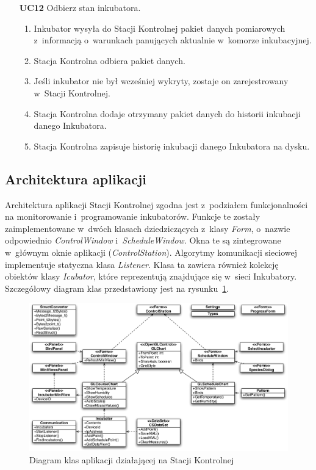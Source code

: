 \begin{itemize}
	\item[\textbf{UC12}] Odbierz stan inkubatora.
		\begin{enumerate}
			\item Inkubator wysyła do Stacji Kontrolnej pakiet danych pomiarowych z~informacją o~warunkach panujących aktualnie w~komorze inkubacyjnej.
			\item Stacja Kontrolna odbiera pakiet danych.
			\item Jeśli inkubator nie był wcześniej wykryty, zostaje on zarejestrowany w~Stacji Kontrolnej.
			\item Stacja Kontrolna dodaje otrzymany pakiet danych do historii inkubacji danego Inkubatora.
			\item Stacja Kontrolna zapisuje historię inkubacji danego Inkubatora na dysku.
		\end{enumerate}
\end{itemize}


\subsection{Architektura aplikacji}
Architektura aplikacji Stacji Kontrolnej zgodna jest z~podziałem funkcjonalności na monitorowanie i~programowanie inkubatorów.
Funkcje te zostały zaimplementowane w~dwóch klasach dziedziczących
z~klasy \emph{Form}, o~nazwie odpowiednio \emph{ControlWindow} i~\emph{ScheduleWindow}. Okna te są zintegrowane
w~głównym oknie aplikacji (\emph{ControlStation}). Algorytmy komunikacji sieciowej implementuje statyczna klasa
\emph{Listener}. Klasa ta zawiera również kolekcję obiektów klasy \emph{Icubator}, które reprezentują znajdujące się w~sieci Inkubatory.
Szczegółowy diagram klas przedstawiony jest na rysunku~\ref{rys:CSClass}.

\begin{figure}[h] 
\centering\includegraphics[width=\textwidth]{figures/CSClass}
\caption{Diagram klas aplikacji działającej na Stacji Kontrolnej}\label{rys:CSClass}
\end{figure}

